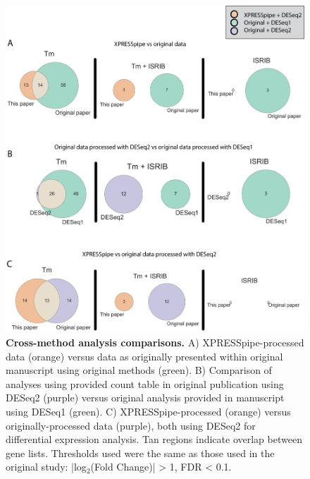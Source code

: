 \documentclass[10pt, oneside]{article}
\begin{document}
\begin{figure}
\centering
  \includegraphics[width=180mm]{figures/xpresspipe_supplement6.png}
  \caption{\textbf{Cross-method analysis comparisons.} A) XPRESSpipe-processed data (orange) versus data as originally presented within original manuscript using original methods (green). B) Comparison of analyses using provided count table in original publication using DESeq2 (purple) versus original analysis provided in manuscript using DESeq1 (green). C) XPRESSpipe-processed (orange) versus originally-processed data (purple), both using DESeq2 for differential expression analysis. Tan regions indicate overlap between gene lists. Thresholds used were the same as those used in the original study: |log$_2$(Fold Change)| > 1, FDR < 0.1.}
  \label{fig:supplement6}
\end{figure}
\end{document}
